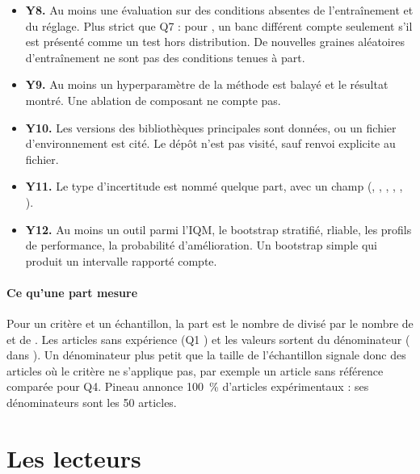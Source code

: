 \begin{itemize}
  \enquote{MATH-500} vaut , \enquote{MATH} seul vaut .
  \item \textbf{Y8.} Au moins une évaluation sur des conditions absentes de l'entraînement et du
  réglage. Plus strict que Q7 : pour , un banc différent compte seulement s'il est présenté
  comme un test hors distribution. De nouvelles graines aléatoires d'entraînement ne sont pas des
  conditions tenues à part.
  \item \textbf{Y9.} Au moins un hyperparamètre de la méthode est balayé et le résultat montré. Une
  ablation de composant ne compte pas.
  \item \textbf{Y10.} Les versions des bibliothèques principales sont données, ou un fichier
  d'environnement est cité. Le dépôt n'est pas visité, sauf renvoi explicite au fichier.
  \item \textbf{Y11.} Le type d'incertitude est nommé quelque part, avec un champ 
  (, , , , , ).
  \item \textbf{Y12.} Au moins un outil parmi l'IQM, le bootstrap stratifié, rliable, les profils de
  performance, la probabilité d'amélioration. Un bootstrap simple qui produit un intervalle rapporté
  compte.
\end{itemize}

\paragraph{Ce qu'une part mesure}
Pour un critère et un échantillon, la part est le nombre de  divisé par le nombre de
 et de . Les articles sans expérience (Q1 ) et les valeurs  sortent
du dénominateur ( dans ). Un dénominateur plus petit que la
taille de l'échantillon signale donc des articles où le critère ne s'applique pas, par exemple un
article sans référence comparée pour Q4. Pineau annonce 100~\% d'articles expérimentaux : ses
dénominateurs sont les 50 articles.

\section{Les lecteurs}\label{sec:sm-lecteurs}

